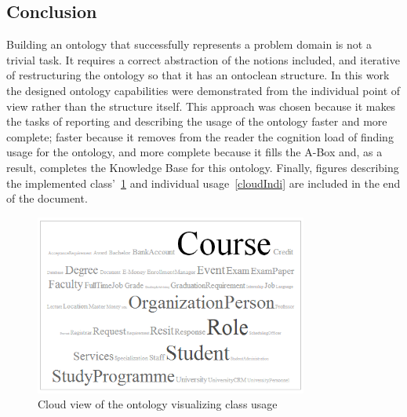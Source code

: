 \documentclass{article}    %
\begin{document}
\subsection{Conclusion}
%
Building an ontology that successfully represents a problem domain is not a trivial task. It requires a correct abstraction of the notions included, and iterative of restructuring the ontology so that it has an ontoclean structure. In this work the designed ontology capabilities were demonstrated from the individual point of view rather than the structure itself. This approach was chosen because it makes the tasks of reporting and describing the usage of the ontology faster and more complete; faster because it removes from the reader the cognition load of finding usage for the ontology, and more complete because it fills the A-Box and, as a result, completes the Knowledge Base for this ontology. Finally, figures describing the implemented class'~\ref{classUsage} and individual usage~\ref{cloudIndi} are included in the end of the document.

\begin{figure}[htbp]
  \centering
    \includegraphics[width=0.8\textwidth]{Materials/Figures/classUsageCloud.png}
    \caption{Cloud view of the ontology visualizing class usage}
  \label{classUsage}
\end{figure}
\end{document}
